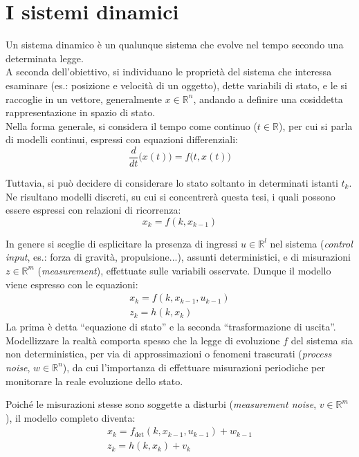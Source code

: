 \documentclass[12pt,a4paper,openright,twoside]{book}
\begin{document}
\section{I sistemi dinamici}

Un sistema dinamico è un qualunque sistema che evolve nel tempo secondo una determinata legge. \\

A seconda dell'obiettivo, si individuano le proprietà del sistema che interessa esaminare (es.: posizione e velocità di un oggetto), dette variabili di stato, e le si raccoglie in un vettore, generalmente $x\in\mathbb{R}^n$, andando a definire una cosiddetta rappresentazione in spazio di stato. \\
Nella forma generale, si considera il tempo come continuo ($t\in\mathbb{R}$), per cui si parla di modelli continui, espressi con equazioni differenziali:
$$\dfrac{d}{dt}\bigl(x(t)\bigr)=f\bigl(t,x(t)\bigr)$$ \pagebreak

Tuttavia, si può decidere di considerare lo stato soltanto in determinati istanti $t_k$. Ne risultano modelli discreti, su cui si concentrerà questa tesi, i quali possono essere espressi con relazioni di ricorrenza:
$$x_k=f(k,x_{k-1})$$

In genere si sceglie di esplicitare la presenza di ingressi $u\in\mathbb{R}^l$ nel sistema (\textit{control input}, es.: forza di gravità, propulsione...), assunti deterministici, e di misurazioni $z\in\mathbb{R}^m$ (\textit{measurement}), effettuate sulle variabili osservate. Dunque il modello viene espresso con le equazioni:
\begin{gather*}
x_k=f(k,x_{k-1},u_{k-1}) \\
z_k=h(k,x_k)
\end{gather*}
La prima è detta ``equazione di stato'' e la seconda ``trasformazione di uscita''. \\

Modellizzare la realtà comporta spesso che la legge di evoluzione $f$ del sistema sia non deterministica, per via di approssimazioni o fenomeni trascurati (\textit{process noise}, $w\in\mathbb{R}^n$), da cui l'importanza di effettuare misurazioni periodiche per monitorare la reale evoluzione dello stato.

Poiché le misurazioni stesse sono soggette a disturbi (\textit{measurement noise}, $v\in\mathbb{R}^m$), il modello completo diventa:
\begin{gather}
x_k=f_\text{det}(k,x_{k-1},u_{k-1})+w_{k-1} \\
z_k=h(k,x_k)+v_k
\end{gather}
\end{document}
